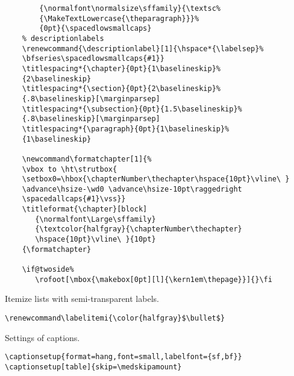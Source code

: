 \begin{lstlisting}
        {\normalfont\normalsize\sffamily}{\textsc%
        {\MakeTextLowercase{\theparagraph}}}%
        {0pt}{\spacedlowsmallcaps}    
    % descriptionlabels
    \renewcommand{\descriptionlabel}[1]{\hspace*{\labelsep}%
    \bfseries\spacedlowsmallcaps{#1}}
    \titlespacing*{\chapter}{0pt}{1\baselineskip}%
    {2\baselineskip}
    \titlespacing*{\section}{0pt}{2\baselineskip}%
    {.8\baselineskip}[\marginparsep]
    \titlespacing*{\subsection}{0pt}{1.5\baselineskip}%
    {.8\baselineskip}[\marginparsep]
    \titlespacing*{\paragraph}{0pt}{1\baselineskip}%
    {1\baselineskip}

    \newcommand\formatchapter[1]{% 
    \vbox to \ht\strutbox{ 
    \setbox0=\hbox{\chapterNumber\thechapter\hspace{10pt}\vline\ } 
    \advance\hsize-\wd0 \advance\hsize-10pt\raggedright 
    \spacedallcaps{#1}\vss}} 
    \titleformat{\chapter}[block] 
       {\normalfont\Large\sffamily} 
       {\textcolor{halfgray}{\chapterNumber\thechapter} 
       \hspace{10pt}\vline\ }{10pt} 
    {\formatchapter}    

    \if@twoside%
       \rofoot[\mbox{\makebox[0pt][l]{\kern1em\thepage}}]{}\fi
\end{lstlisting}



Itemize lists with semi-transparent labels.
\begin{lstlisting}
\renewcommand\labelitemi{\color{halfgray}$\bullet$} 
\end{lstlisting}



Settings of captions.
\begin{lstlisting}
\captionsetup{format=hang,font=small,labelfont={sf,bf}}
\captionsetup[table]{skip=\medskipamount}
\end{lstlisting}





